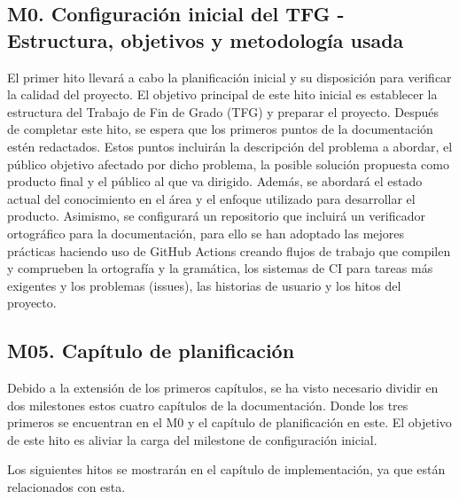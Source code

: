 \subsection{M0. Configuración inicial del TFG - Estructura, objetivos y metodología usada}
El primer hito llevará a cabo la planificación inicial y su disposición para verificar la calidad del
proyecto.
El objetivo principal de este hito inicial es establecer la estructura del Trabajo de Fin de Grado (TFG) y preparar el proyecto. Después de completar este hito, se espera que los primeros puntos de la documentación estén redactados. Estos puntos incluirán la descripción del problema a abordar, el público objetivo afectado por dicho problema, la posible solución propuesta como producto final y el público al que va dirigido. Además, se abordará el estado actual del conocimiento en el área y el enfoque utilizado para desarrollar el producto. Asimismo, se configurará un repositorio que incluirá un verificador ortográfico para la documentación, para ello se han adoptado las mejores prácticas haciendo uso de GitHub Actions creando flujos de trabajo que compilen y comprueben la ortografía y la gramática, los sistemas de CI para tareas más exigentes y los problemas (issues), las historias de usuario y los hitos del proyecto.

\subsection{M05. Capítulo de planificación}
Debido a la extensión de los primeros capítulos, se ha visto necesario dividir en dos milestones estos cuatro capítulos de la documentación. Donde los tres primeros se encuentran en el M0 y el capítulo de planificación en este.
El objetivo de este hito es aliviar la carga del milestone de configuración inicial.\vspace{0.5cm}

Los siguientes hitos se mostrarán en el capítulo de implementación, ya que están relacionados con esta.







